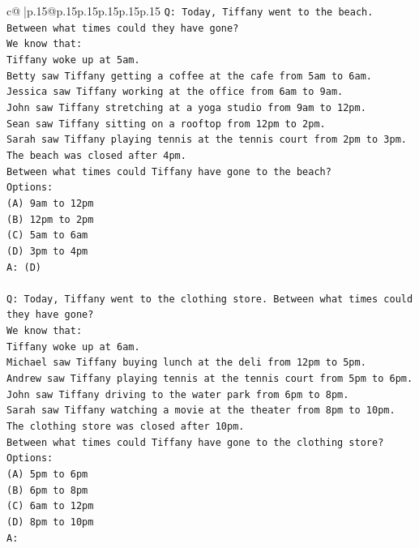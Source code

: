 \documentclass{article}
\begin{document}
{\begin{supertabular}{c@{$\;$}|p{.15\linewidth}@{}p{.15\linewidth}p{.15\linewidth}p{.15\linewidth}p{.15\linewidth}p{.15\linewidth}}
{{{\texttt{Q: Today, Tiffany went to the beach. Between what times could they have gone?} \\
\texttt{We know that:} \\
\texttt{Tiffany woke up at 5am.} \\
\texttt{Betty saw Tiffany getting a coffee at the cafe from 5am to 6am.} \\
\texttt{Jessica saw Tiffany working at the office from 6am to 9am.} \\
\texttt{John saw Tiffany stretching at a yoga studio from 9am to 12pm.} \\
\texttt{Sean saw Tiffany sitting on a rooftop from 12pm to 2pm.} \\
\texttt{Sarah saw Tiffany playing tennis at the tennis court from 2pm to 3pm.} \\
\texttt{The beach was closed after 4pm.} \\
\texttt{Between what times could Tiffany have gone to the beach?} \\
\texttt{Options:} \\
\texttt{(A) 9am to 12pm} \\
\texttt{(B) 12pm to 2pm} \\
\texttt{(C) 5am to 6am} \\
\texttt{(D) 3pm to 4pm} \\
\texttt{A: (D)} \\
\\ 
\texttt{Q: Today, Tiffany went to the clothing store. Between what times could they have gone?} \\
\texttt{We know that:} \\
\texttt{Tiffany woke up at 6am.} \\
\texttt{Michael saw Tiffany buying lunch at the deli from 12pm to 5pm.} \\
\texttt{Andrew saw Tiffany playing tennis at the tennis court from 5pm to 6pm.} \\
\texttt{John saw Tiffany driving to the water park from 6pm to 8pm.} \\
\texttt{Sarah saw Tiffany watching a movie at the theater from 8pm to 10pm.} \\
\texttt{The clothing store was closed after 10pm.} \\
\texttt{Between what times could Tiffany have gone to the clothing store?} \\
\texttt{Options:} \\
\texttt{(A) 5pm to 6pm} \\
\texttt{(B) 6pm to 8pm} \\
\texttt{(C) 6am to 12pm} \\
\texttt{(D) 8pm to 10pm} \\
\texttt{A:} \\
            }
        }
    }
     \\ \\


\end{supertabular}}
\end{document}
